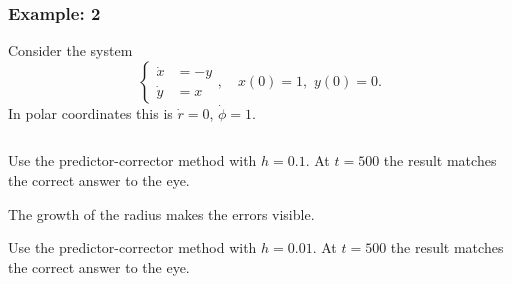 \documentclass{beamer}
\begin{document}
\begin{frame}
  \frametitle{Example: 2}


  Consider the system
  \begin{equation*}
    \left\{
      \begin{aligned}
        \dot{x} & = -y \\ \dot{y} & = x
      \end{aligned} \right., \quad x(0) = 1, \, \, y(0) = 0.
  \end{equation*}
  In polar coordinates this is $\dot{r} = 0$, $\dot{\phi} = 1$.
  \begin{columns}
    \begin{column}{0.5\textwidth}
      \begin{overlayarea}{\textwidth}{0.4\textheight}
        {
          Use the predictor-corrector method with $h=0.1$. At $t=500$
          the result matches the correct answer to the eye.
        }
        {

          \vspace{1ex}
          The growth of the radius makes the errors visible.
        }
        {
          Use the predictor-corrector method with $h=0.01$. At $t=500$
          the result matches the correct answer to the eye.
        }
        {

}
\end{overlayarea}
\end{column}
\end{columns}
\end{frame}
\end{document}
